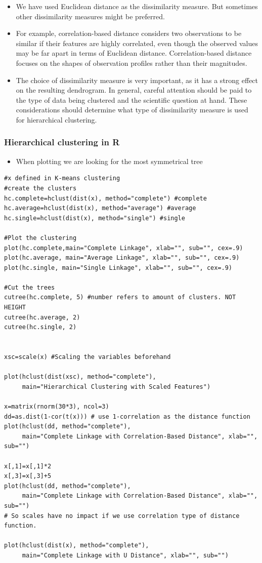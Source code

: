 \documentclass{article}
\begin{document}
\begin{itemize}
    \item We have used Euclidean distance as the dissimilarity measure. But sometimes other dissimilarity measures might be preferred.
    \item For example, correlation-based distance considers two observations to be similar if their features are highly correlated, even though the observed values may be far apart in terms of Euclidean distance. Correlation-based distance focuses on the shapes of observation profiles rather than their magnitudes.
    \item The choice of dissimilarity measure is very important, as it has a strong effect on the resulting dendrogram. In general, careful attention should be paid to the type of data being clustered and the scientific question at hand. These considerations should determine what type of dissimilarity measure is used for hierarchical clustering.
\end{itemize}



\subsubsection{Hierarchical clustering in R}


\begin{itemize}
    \item When plotting we are looking for the most symmetrical tree
\end{itemize}
\begin{lstlisting}
#x defined in K-means clustering
#create the clusters
hc.complete=hclust(dist(x), method="complete") #complete
hc.average=hclust(dist(x), method="average") #average
hc.single=hclust(dist(x), method="single") #single

#Plot the clustering
plot(hc.complete,main="Complete Linkage", xlab="", sub="", cex=.9)
plot(hc.average, main="Average Linkage", xlab="", sub="", cex=.9)
plot(hc.single, main="Single Linkage", xlab="", sub="", cex=.9)

#Cut the trees
cutree(hc.complete, 5) #number refers to amount of clusters. NOT HEIGHT
cutree(hc.average, 2)
cutree(hc.single, 2)


xsc=scale(x) #Scaling the variables beforehand

plot(hclust(dist(xsc), method="complete"), 
     main="Hierarchical Clustering with Scaled Features")

x=matrix(rnorm(30*3), ncol=3)
dd=as.dist(1-cor(t(x))) # use 1-correlation as the distance function
plot(hclust(dd, method="complete"), 
     main="Complete Linkage with Correlation-Based Distance", xlab="", sub="")

x[,1]=x[,1]*2
x[,3]=x[,3]+5
plot(hclust(dd, method="complete"), 
     main="Complete Linkage with Correlation-Based Distance", xlab="", sub="")
# So scales have no impact if we use correlation type of distance function.

plot(hclust(dist(x), method="complete"), 
     main="Complete Linkage with U Distance", xlab="", sub="")
\end{lstlisting}
\end{document}
